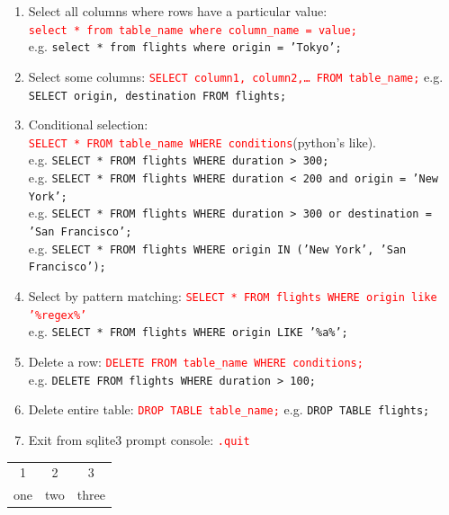 \documentclass[12 pt, letterpaper]{extarticle}
\newcommand{\R}{\textcolor{red}} %
\newcommand{\T}{\texttt}
\begin{document}
\begin{enumerate}
		\item Select all columns where rows have a particular value:\\
			\R{\T{select * from table\_name where column\_name = value;}}\\
			e.g. \textcolor{red!70}{\T{select * from flights where origin = 'Tokyo';}}
		\item Select some columns: \R{\T{SELECT column1, column2,\dots\hspace{0.1cm} FROM table\_name;}}
			e.g. \textcolor{red!70}{\T{SELECT origin, destination FROM flights;}}
		\item Conditional selection:\\
			\R{\T{SELECT * FROM table\_name WHERE conditions}}(python's like).\\
			e.g. \textcolor{red!70}{\T{SELECT * FROM flights WHERE duration > 300;}}\\
			e.g. \textcolor{red!70}{\T{SELECT * FROM flights WHERE duration < 200 and origin = 'New York';}}\\
			e.g. \textcolor{red!70}{\T{SELECT * FROM flights WHERE duration > 300 or destination = 'San Francisco';}}\\
			e.g. \textcolor{red!70}{\T{SELECT * FROM flights WHERE origin IN ('New York', 'San Francisco');}}
		\item Select by pattern matching: \R{\T{SELECT * FROM flights WHERE origin like '\%regex\%'}}\\
			e.g. \textcolor{red!70}{\T{SELECT * FROM flights WHERE origin LIKE '\%a\%';}}
		\item Delete a row: \R{\T{DELETE FROM table\_name WHERE conditions;}}\\
			e.g. \textcolor{red!70}{\T{DELETE FROM flights WHERE duration > 100;}}
		\item Delete entire table: \R{\T{DROP TABLE table\_name;}}
			e.g. \textcolor{red!70}{\T{DROP TABLE flights;}}
		\item Exit from sqlite3 prompt console: \R{\T{.quit}}
	\end{enumerate}
	
	\begin{tabular}{c c c}
		 1  & 2   & 3     \\
		one & two & three
	\end{tabular}
\end{document}
